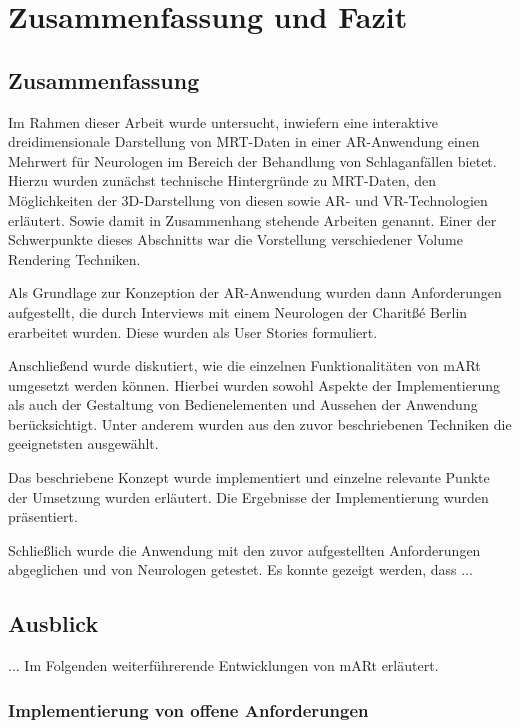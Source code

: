 
\chapter{Zusammenfassung und Fazit}

\section{Zusammenfassung}

Im Rahmen dieser Arbeit wurde untersucht, inwiefern eine interaktive dreidimensionale Darstellung von MRT-Daten in einer AR-Anwendung einen Mehrwert für Neurologen im Bereich der Behandlung von Schlaganfällen bietet. 
Hierzu wurden zunächst technische Hintergründe zu MRT-Daten, den Möglichkeiten der 3D-Darstellung von diesen sowie AR- und VR-Technologien erläutert. Sowie damit in Zusammenhang stehende Arbeiten genannt. Einer der Schwerpunkte dieses Abschnitts war die Vorstellung verschiedener Volume Rendering Techniken.

Als Grundlage zur Konzeption der AR-Anwendung wurden dann Anforderungen aufgestellt, die durch Interviews mit einem Neurologen der Charitßé Berlin erarbeitet wurden. Diese wurden als User Stories formuliert.

Anschließend wurde diskutiert, wie die einzelnen Funktionalitäten von mARt umgesetzt werden können. Hierbei wurden sowohl Aspekte der Implementierung als auch der Gestaltung von Bedienelementen und Aussehen der Anwendung berücksichtigt. Unter anderem wurden aus den zuvor beschriebenen Techniken die geeignetsten ausgewählt. 

Das beschriebene Konzept wurde implementiert und einzelne relevante Punkte der Umsetzung wurden erläutert. Die Ergebnisse der Implementierung wurden präsentiert.

Schließlich wurde die Anwendung mit den zuvor aufgestellten Anforderungen abgeglichen und von Neurologen getestet. 
Es konnte gezeigt werden, dass ...

\section{Ausblick}

...
Im Folgenden weiterführerende Entwicklungen von mARt erläutert.

\subsection{Implementierung von offene  Anforderungen}

